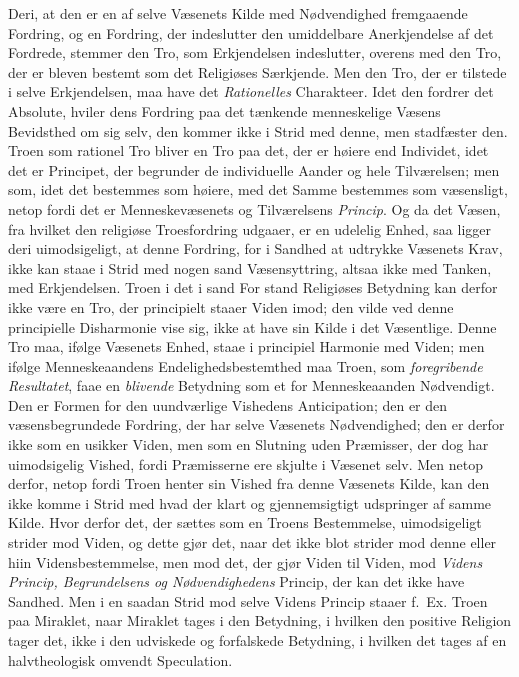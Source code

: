 Deri, at den er en af selve Væsenets Kilde med Nødvendighed fremgaaende
Fordring, og en Fordring, der indeslutter den umiddelbare Anerkjendelse af det
Fordrede, stemmer den Tro, som Erkjendelsen indeslutter, overens med den Tro,
der er bleven bestemt som det Religiøses Særkjende. Men den Tro, der er tilstede
i selve Erkjendelsen, maa have det \emph{Rationelles} Charakteer. Idet den
fordrer det Absolute, hviler dens Fordring paa det tænkende menneskelige
Væsens Bevidsthed om sig selv, den kommer ikke i Strid med denne, men
stadfæster den. Troen som rationel Tro bliver en Tro paa det, der er høiere end
Individet, idet det er Principet, der begrunder de individuelle Aander og hele
Tilværelsen; men som, idet det bestemmes som høiere, med det Samme bestemmes
som væsensligt, netop fordi det er Menneskevæsenets og Tilværelsens
\emph{Princip}. Og da det Væsen, fra hvilket den religiøse Troesfordring
udgaaer, er en udelelig Enhed, saa ligger deri uimodsigeligt, at denne Fordring,
for i Sandhed at udtrykke Væsenets Krav, ikke kan staae i Strid med nogen sand
Væsensyttring, altsaa ikke med Tanken, med Erkjendelsen. Troen i det i sand For\-%
stand Religiøses Betydning kan derfor ikke være en Tro, der principielt staaer
Viden imod; den vilde ved denne principielle Disharmonie vise sig, ikke at have
sin Kilde i det Væsentlige. Denne Tro maa, ifølge Væsenets Enhed, staae i
principiel Harmonie med Viden; men ifølge Menneskeaandens
Endelighedsbestemthed maa Troen, som \emph{foregribende Resultatet}, faae en
\emph{blivende} Betydning som et for Menneskeaanden Nødvendigt. Den er Formen
for den uundværlige Vishedens Anticipation; den er den væsensbegrundede
Fordring, der har selve Væsenets Nødvendighed; den er derfor ikke som en usikker
Viden, men som en Slutning uden Præmisser, der dog har uimodsigelig Vished,
fordi Præmisserne ere skjulte i Væsenet selv. Men netop derfor, netop fordi
Troen henter sin Vished fra denne Væsenets Kilde, kan den ikke komme i Strid med
hvad der klart og gjennemsigtigt udspringer af samme Kilde. Hvor derfor det, der
sættes som en Troens Bestemmelse, uimodsigeligt strider mod Viden, og dette gjør
det, naar det ikke blot strider mod denne eller hiin Vidensbestemmelse, men mod
det, der gjør Viden til Viden, mod \emph{Videns Princip, Begrundelsens og
Nødvendighedens} Princip, der kan det ikke have Sandhed. Men i en saadan Strid
mod selve Videns Princip staaer f.\ Ex. Troen paa Miraklet, naar Miraklet tages
i den Betydning, i hvilken den positive Religion tager det, ikke i den udviskede
og forfalskede Betydning, i hvilken det tages af en halvtheologisk omvendt
Speculation.

